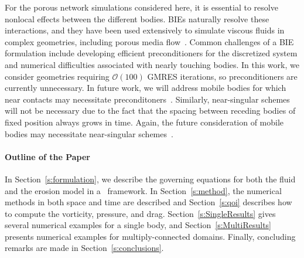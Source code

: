 \documentclass[preprint, 10pt]{elsarticle}
\begin{document}
For the porous network simulations considered here, it is essential to resolve nonlocal effects between the different bodies.  BIEs naturally resolve these interactions, and they have been used extensively to simulate viscous fluids in complex geometries, including porous media flow~\cite{dea-qua-bir-jua2018, bar-mar-vee-zha2018}.  Common challenges of a BIE formulation include developing efficient preconditioners for the discretized system and numerical difficulties associated with nearly touching bodies. In this work, we consider geometries requiring $\mathcal{O}(100)$ GMRES iterations, so preconditioners are currently unnecessary. In future work, we will address mobile bodies for which near contacts may necessitate preconditoners~\cite{qua-bir2015a, qua-cou-dar2018, cou-pou-dar2017}. Similarly, near-singular schemes will not be necessary due to the fact that the spacing between receding bodies of fixed position always grows in time. Again, the future consideration of mobile bodies may necessitate near-singular schemes~\cite{qua-bir2014a, klo-bar-gre-one2013, bar-wu-vee2015, hel-oja2008a, bea-lai2001}.

\paragraph{Outline of the Paper}
In Section~\ref{s:formulation}, we describe the governing equations for both the fluid and the erosion model in a \thL~framework.  In Section~\ref{s:method}, the numerical methods in both space and time are described and Section~\ref{s:qoi} describes how to compute the vorticity, pressure, and drag.  Section~\ref{s:SingleResults} gives several numerical examples for a single body, and Section~\ref{s:MultiResults} presents numerical examples for multiply-connected domains.  Finally, concluding remarks are made in Section~\ref{s:conclusions}.

\end{document}

